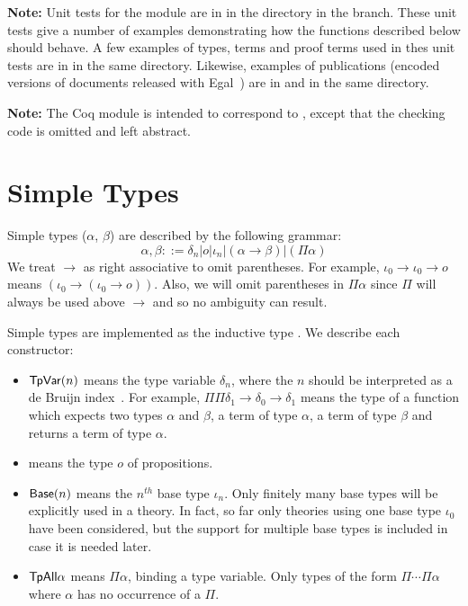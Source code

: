 {\bf{Note:}} Unit tests for the {} module are in {}
in the {}
directory in the {} branch.
These unit tests give a number of examples demonstrating how the functions described below should behave.
A few examples of types, terms and proof terms used in thes unit tests are
in {} in the same directory.
Likewise, examples of publications (encoded versions of documents released with Egal~\cite{Brown2014}) are in
{} and {} in the same directory.

{\bf{Note:}} The Coq module {} is intended to correspond to {},
except that the checking code is omitted and left abstract.

\section{Simple Types}

Simple types ($\alpha$, $\beta$) are described by the following grammar:
$$
\alpha,\beta ::=  \delta_n |o|\iota_n|(\alpha\to\beta)|(\Pi \alpha)
$$
We treat $\to$ as right associative to omit parentheses.
For example, $\iota_0\to\iota_0\to o$
means $(\iota_0\to (\iota_0\to o))$.
Also, we will omit parentheses in $\Pi \alpha$ since
$\Pi$ will always be used above $\to$ and so no
ambiguity can result.

Simple types are implemented as the inductive type {}.
We describe each constructor:
\begin{itemize}
\item ${\mbox{\constr{TpVar}}}(n)$ means the type variable $\delta_n$, where
the $n$ should be interpreted as a de Bruijn index~\cite{deBruijn72}.
For example, $\Pi \Pi \delta_1 \to \delta_0 \to \delta_1$
means the type
of a function which expects two types $\alpha$ and $\beta$,
a term of type $\alpha$, a term of type $\beta$
and returns a term of type $\alpha$.
\item {} means the type $o$ of propositions.
\item ${\mbox{\constr{Base}}}(n)$ means the $n^{th}$ base type $\iota_n$. Only finitely many base types will be explicitly used in
a theory. In fact, so far only theories using one base type
$\iota_0$ have been considered, but the support for multiple
base types is included in case it is needed later.
\item ${\mbox{\constr{TpAll}}} \alpha$ means $\Pi \alpha$, binding a type variable. Only types of the form $\Pi\cdots\Pi\alpha$
where $\alpha$ has no occurrence of a $\Pi$.
\end{itemize}

